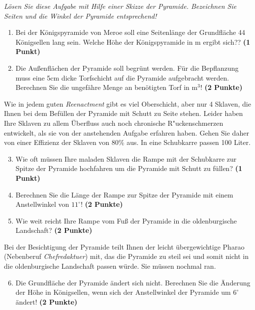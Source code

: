 \documentclass[a4paper, 10pt]{scrartcl}\usepackage[]{graphicx}\usepackage[]{xcolor}
\begin{document}
\textit{L{\"o}sen Sie diese Aufgabe mit Hilfe einer Skizze der Pyramide. Bezeichnen
  Sie Seiten und die Winkel der Pyramide entsprechend!}

\begin{enumerate}
\item Bei der K{\"o}nigspyramide von Meroe soll eine Seitenl{\"a}nge der Grundfl{\"a}che
  44 K{\"o}nigsellen lang sein. Welche H{\"o}he der K{\"o}nigspyramide in m
  ergibt sich?? \textbf{(1 Punkt)}
\item Die Au{\ss}enfl{\"a}chen der Pyramide soll begr{\"u}nt werden. F{\"u}r die
  Bepflanzung muss eine 5cm dicke Torfschicht auf die
  Pyramide aufgebracht werden. Berechnen Sie die ungef{\"a}hre Menge an
  ben{\"o}tigten Torf in m$^3$! \textbf{(2 Punkte)}
\end{enumerate}

Wie in jedem guten \textit{Reenactment} gibt es viel Oberschicht, aber nur
4 Sklaven, die Ihnen bei dem Bef{\"u}llen der Pyramide mit Schutt
zu Seite stehen. Leider haben Ihre Sklaven zu allem {\"U}berfluss auch noch
chronische R{"u}ckenschmerzen entwickelt, als sie von der
anstehenden Aufgabe erfahren haben. Gehen Sie daher von einer Effizienz der
Sklaven von 80\% aus. In eine Schubkarre passen
100 Liter.

\begin{enumerate}
  \setcounter{enumi}{2}
\item Wie oft m{\"u}ssen Ihre maladen Sklaven die Rampe mit der Schubkarre
  zur Spitze der Pyramide hochfahren um die Pyramide mit Schutt zu f{\"u}llen? \textbf{(1 Punkt)}
\item Berechnen Sie die L{\"a}nge der Rampe zur Spitze der Pyramide mit einem
  Anstellwinkel von $11^\circ$! \textbf{(2 Punkte)}
\item Wie weit reicht Ihre Rampe vom Fu{\ss} der Pyramide in die oldenburgische
  Landschaft?  \textbf{(2 Punkte)}
\end{enumerate}

Bei der Besichtigung der Pyramide teilt Ihnen der leicht {\"u}bergewichtige
Pharao (Nebenberuf \textit{Chefredaktuer}) mit, das die Pyramide zu
steil sei und somit nicht in die oldenburgische Landschaft passen
w{\"u}rde. Sie m{\"u}ssen nochmal ran.

\begin{enumerate}
  \setcounter{enumi}{5}
\item Die Grundfl{\"a}che der Pyramide {\"a}ndert sich nicht. Berechnen Sie die
  {\"A}nderung der H{\"o}he in K{\"o}nigsellen, wenn sich der Anstellwinkel der
  Pyramide um $6^\circ$ {\"a}ndert!  \textbf{(2 Punkte)}
\end{enumerate}
\end{document}
